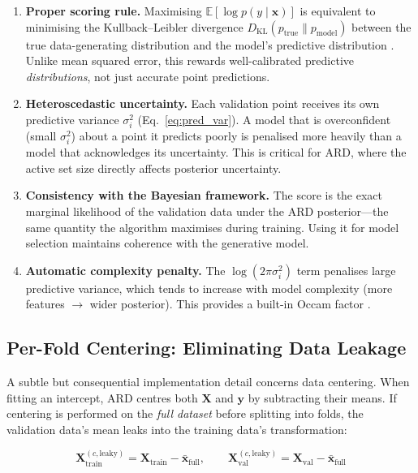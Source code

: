 \documentclass[11pt,a4paper]{article}
\begin{document}
\begin{enumerate}
\item \textbf{Proper scoring rule.} Maximising $\mathbb{E}[\log p(y \mid \mathbf{x})]$ is equivalent to minimising the Kullback--Leibler divergence $D_{\text{KL}}(p_{\text{true}} \parallel p_{\text{model}})$ between the true data-generating distribution and the model's predictive distribution \citep{gneiting2007}. Unlike mean squared error, this rewards well-calibrated predictive \emph{distributions}, not just accurate point predictions.

\item \textbf{Heteroscedastic uncertainty.} Each validation point receives its own predictive variance $\sigma_i^2$ (Eq.~\ref{eq:pred_var}). A model that is overconfident (small $\sigma_i^2$) about a point it predicts poorly is penalised more heavily than a model that acknowledges its uncertainty. This is critical for ARD, where the active set size directly affects posterior uncertainty.

\item \textbf{Consistency with the Bayesian framework.} The score is the exact marginal likelihood of the validation data under the ARD posterior---the same quantity the algorithm maximises during training. Using it for model selection maintains coherence with the generative model.

\item \textbf{Automatic complexity penalty.} The $\log(2\pi\sigma_i^2)$ term penalises large predictive variance, which tends to increase with model complexity (more features $\to$ wider posterior). This provides a built-in Occam factor \citep{mackay1992}.
\end{enumerate}

\subsection{Per-Fold Centering: Eliminating Data Leakage}

A subtle but consequential implementation detail concerns data centering. When fitting an intercept, ARD centres both $\mathbf{X}$ and $\mathbf{y}$ by subtracting their means. If centering is performed on the \emph{full dataset} before splitting into folds, the validation data's mean leaks into the training data's transformation:

\begin{equation}
\mathbf{X}_{\text{train}}^{(c,\text{leaky})} = \mathbf{X}_{\text{train}} - \bar{\mathbf{x}}_{\text{full}}, \qquad
\mathbf{X}_{\text{val}}^{(c,\text{leaky})} = \mathbf{X}_{\text{val}} - \bar{\mathbf{x}}_{\text{full}}
\label{eq:leaky_centering}
\end{equation}
\end{document}
